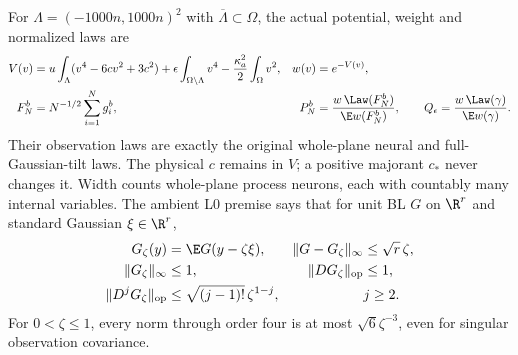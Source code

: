 For $\Lambda=(-1000n,1000n)^2$ with $\overline\Lambda\subset\Omega$, the
actual potential, weight and normalized laws are
\begin{align*}
 V(v)&=u\int_\Lambda(v^4-6cv^2+3c^2)
       +\epsilon\int_{\Omega\setminus\Lambda}v^4
       -\frac{\kappa_a^2}{2}\int_\Omega v^2,&w(v)&=e^{-V(v)},\\
 F_N^b&=N^{-1/2}\sum_{i=1}^N g_i^b,&
 P_N^b&=\frac{w\,\Law(F_N^b)}{\E w(F_N^b)},\qquad
 Q_\epsilon=\frac{w\,\Law(\gamma)}{\E w(\gamma)}.
\end{align*}
Their observation laws are exactly the original whole-plane neural and
full-Gaussian-tilt laws. The physical $c$ remains in $V$; a positive
majorant $c_*$ never changes it. Width counts whole-plane process neurons,
each with countably many internal variables. The ambient L0 premise says
that for unit BL $G$ on $\R^r$ and standard Gaussian $\xi\in\R^r$,
\begin{align*}
 G_\zeta(y)&=\E G(y-\zeta\xi),&
 \|G-G_\zeta\|_\infty&\le\sqrt r\,\zeta,\\
 \|G_\zeta\|_\infty&\le1,&\|DG_\zeta\|_{\mathrm{op}}&\le1,\\
 \|D^jG_\zeta\|_{\mathrm{op}}&\le\sqrt{(j-1)!}\,\zeta^{1-j},&&j\ge2.
\end{align*}
For $0<\zeta\le1$, every norm through order four is at most
$\sqrt6\zeta^{-3}$, even for singular observation covariance.

